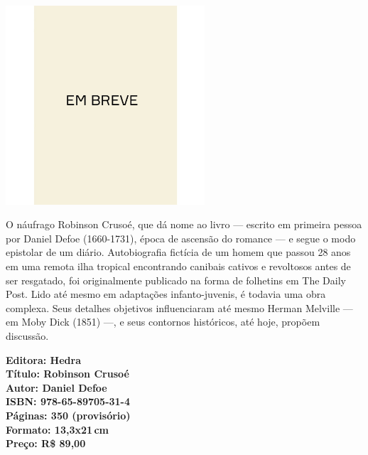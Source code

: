 \begin{center}
\hspace*{.5cm}\includegraphics[width=74mm]{./CAPAS/breve.jpeg}
\end{center}
\hspace*{-7cm}\hrulefill\hspace*{-7cm}
\medskip

\noindent{}O náufrago Robinson Crusoé, que dá nome ao livro — escrito em primeira pessoa por Daniel Defoe (1660-1731), época de ascensão do romance — e segue o modo epistolar de um diário. Autobiografia fictícia de um homem que passou 28 anos em uma remota ilha tropical encontrando canibais cativos e revoltosos antes de ser resgatado, foi originalmente publicado na forma de folhetins em The Daily Post. Lido até mesmo em adaptações infanto-juvenis, é todavia uma obra complexa. Seus detalhes objetivos influenciaram até mesmo Herman Melville  — em Moby Dick (1851) —, e seus contornos históricos, até hoje, propõem discussão.

\vfill
\noindent\begin{minipage}[c]{1\linewidth}
{\small\textbf{
\hspace*{-.1cm}Editora: Hedra\\
Título: Robinson Crusoé\\
Autor: Daniel Defoe\\ 
ISBN: 978-65-89705-31-4\\
Páginas: 350 (provisório)\\
Formato: 13,3x21\,cm\\
Preço: R\$ 89,00\\
}}
\end{minipage}
\pagebreak

